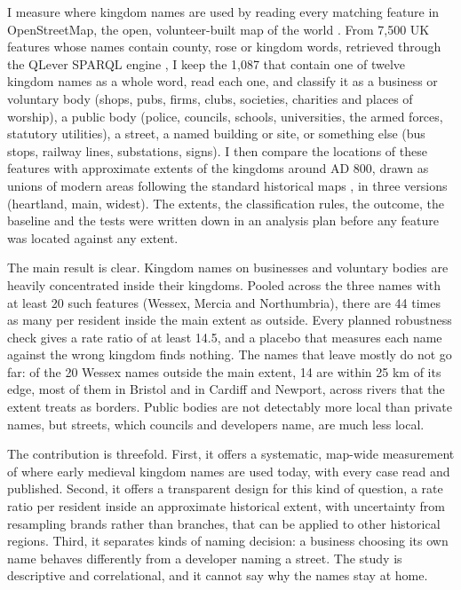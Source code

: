 \documentclass[11pt,a4paper]{article}
\begin{document}
I measure where kingdom names are used by reading every matching feature in OpenStreetMap, the open, volunteer-built map of the world \citep{haklay2008}. From 7,500 UK features whose names contain county, rose or kingdom words, retrieved through the QLever SPARQL engine \citep{bast2017,bast2021}, I keep the 1,087 that contain one of twelve kingdom names as a whole word, read each one, and classify it as a business or voluntary body (shops, pubs, firms, clubs, societies, charities and places of worship), a public body (police, councils, schools, universities, the armed forces, statutory utilities), a street, a named building or site, or something else (bus stops, railway lines, substations, signs). I then compare the locations of these features with approximate extents of the kingdoms around AD 800, drawn as unions of modern areas following the standard historical maps \citep{hill1981,yorke1990}, in three versions (heartland, main, widest). The extents, the classification rules, the outcome, the baseline and the tests were written down in an analysis plan before any feature was located against any extent.

The main result is clear. Kingdom names on businesses and voluntary bodies are heavily concentrated inside their kingdoms. Pooled across the three names with at least 20 such features (Wessex, Mercia and Northumbria), there are 44 times as many per resident inside the main extent as outside. Every planned robustness check gives a rate ratio of at least 14.5, and a placebo that measures each name against the wrong kingdom finds nothing. The names that leave mostly do not go far: of the 20 Wessex names outside the main extent, 14 are within 25 km of its edge, most of them in Bristol and in Cardiff and Newport, across rivers that the extent treats as borders. Public bodies are not detectably more local than private names, but streets, which councils and developers name, are much less local.

The contribution is threefold. First, it offers a systematic, map-wide measurement of where early medieval kingdom names are used today, with every case read and published. Second, it offers a transparent design for this kind of question, a rate ratio per resident inside an approximate historical extent, with uncertainty from resampling brands rather than branches, that can be applied to other historical regions. Third, it separates kinds of naming decision: a business choosing its own name behaves differently from a developer naming a street. The study is descriptive and correlational, and it cannot say why the names stay at home.
\end{document}

